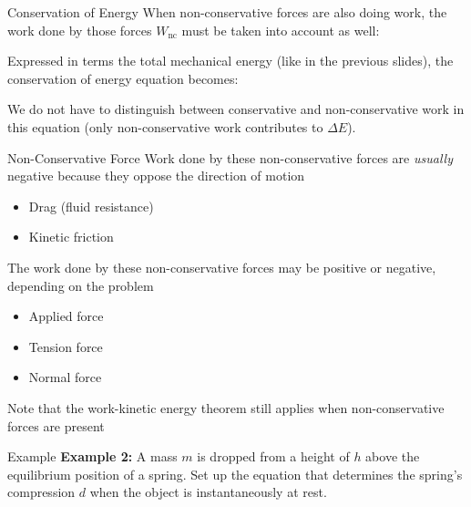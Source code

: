 \documentclass[12pt,compress,aspectratio=169]{beamer}
\begin{document}
\begin{frame}{Conservation of Energy}
  When non-conservative forces are also doing work, the work done by those
  forces $W_\text{nc}$ must be taken into account as well:
    

  Expressed in terms the total mechanical energy (like in the previous slides),
  the conservation of energy equation becomes:
  

  We do not have to distinguish between conservative and non-conservative work
  in this equation (only non-conservative work contributes to $\Delta E$).
\end{frame}



\begin{frame}{Non-Conservative Force}
  Work done by these non-conservative forces are \emph{usually} negative
  because they oppose the direction of motion
  \begin{itemize}
  \item Drag (fluid resistance)
  \item Kinetic friction
  \end{itemize}
  The work done by these non-conservative forces may be positive or negative,
  depending on the problem
  \begin{itemize}
  \item Applied force
  \item Tension force
  \item Normal force
  \end{itemize}
  Note that the work-kinetic energy theorem still applies when non-conservative
  forces are present
\end{frame}


\begin{frame}{Example}
  \textbf{Example 2:} A mass $m$ is dropped from a height of $h$ above the
  equilibrium position of a spring. Set up the equation that determines the
  spring's compression $d$ when the object is instantaneously at rest.
  \begin{center}
  \end{center}
\end{frame}
\end{document}
